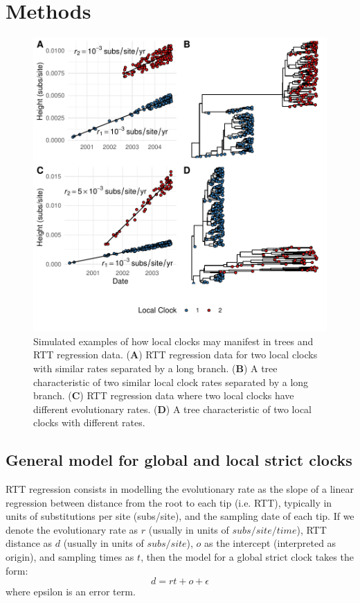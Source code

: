 \documentclass{article}
\begin{document}
\section*{Methods}

\begin{figure}[H]
\centering
\includegraphics[width = 0.75\linewidth]{figures/egRTT}
\caption{Simulated examples of how local clocks may manifest in trees and RTT regression data. (\textbf{A}) RTT regression data for two local clocks with similar rates separated by a long branch. (\textbf{B})
A tree characteristic of two similar local clock rates separated by a long branch. (\textbf{C}) RTT regression data where two local clocks have different evolutionary rates. (\textbf{D}) A tree characteristic of two local clocks with different rates.}
\label{fig:egRTT}
\end{figure}

\subsection*{General model for global and local strict clocks}
RTT regression consists in modelling the evolutionary rate as the slope of a linear regression between distance from the root to each tip (i.e. RTT), typically in units of substitutions per site (subs/site), and the sampling date of each tip. If we denote the evolutionary rate as $r$ (usually in units of $subs/site/time$), RTT distance as $d$ (usually in units of $subs/site$), $o$ as the intercept (interpreted as origin), and sampling times as $t$, then the model for a global strict clock takes the form:
\begin{equation*}
    d = rt + o + \epsilon
\end{equation*}
where epsilon is an error term.
\end{document}
